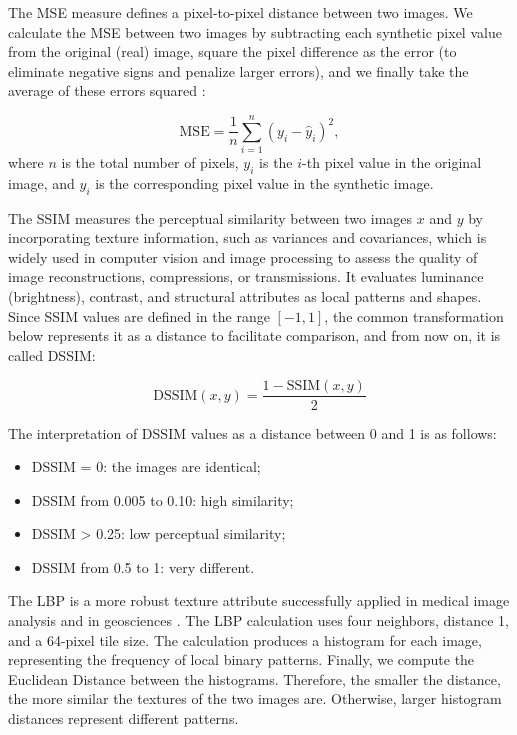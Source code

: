 \documentclass{ieeeaccess}
\begin{document}
The MSE measure defines a pixel-to-pixel distance between two images. We calculate the MSE between two images by   subtracting each synthetic pixel value from the original (real) image, square the pixel difference as the error (to eliminate  negative signs and penalize larger errors), and we finally take the average of these errors squared :

\begin{equation}
\label{eq:mse}
\text{MSE} = \frac{1}{n} \sum_{i=1}^{n} (y_i - \hat{y}_i)^2,
\end{equation}
where $n$ is the total number of pixels, $y_i$ is the $i$-th pixel value in the original image, and $\hat{y}_i$ is the corresponding pixel value in the synthetic image.

The SSIM measures the perceptual similarity between two images $x$ and $y$ by incorporating texture information, such as variances and covariances, which is widely used in computer vision and image processing to assess the quality of image reconstructions, compressions, or transmissions. It evaluates luminance (brightness), contrast, and structural attributes as local patterns and shapes. Since SSIM values are defined in the range $[-1, 1]$, the common transformation below  represents it as a distance to facilitate comparison, and from now on, it is called DSSIM:

\begin{equation}
\label{eq:mse2}
\text{DSSIM}(x, y) = \frac{1 - \text{SSIM}(x, y)}{2}
\end{equation}

The interpretation of DSSIM values as a distance between 0 and 1 is as follows: 

\begin{itemize}
    \item DSSIM = 0: the images are identical;
    \item DSSIM from 0.005 to 0.10: high similarity;
    \item DSSIM > 0.25: low perceptual similarity;
    \item DSSIM from 0.5 to 1: very different.
\end{itemize}

The LBP is a more robust texture attribute successfully applied in medical image analysis and in geosciences \cite{Vatamanu2013,BrittoMattos2017}. The LBP calculation uses four neighbors, distance 1, and a 64-pixel tile size. The calculation produces a histogram for each image, representing the frequency of local binary patterns. Finally, we compute the Euclidean Distance between the histograms. Therefore, the smaller the distance, the more similar the textures of the two images are. Otherwise, larger histogram distances represent different patterns.
\end{document}
